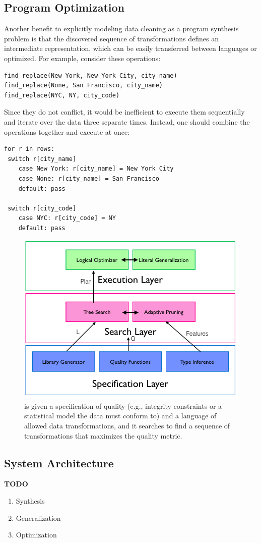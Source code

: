 \subsection{Program Optimization}
Another benefit to explicitly modeling data cleaning as a program synthesis problem is that the discovered sequence of transformations defines an intermediate
representation, which can be easily transferred between languages or optimized.
For example, consider these operations:
\begin{lstlisting}
find_replace(New York, New York City, city_name)
find_replace(None, San Francisco, city_name)
find_replace(NYC, NY, city_code)
\end{lstlisting}
Since they do not conflict, it would be inefficient to execute them sequentially and iterate over the data three separate times.
Instead, one should combine the operations together and execute at once:
\begin{lstlisting}
for r in rows:
 switch r[city_name]
    case New York: r[city_name] = New York City
    case None: r[city_name] = San Francisco
    default: pass
    
 switch r[city_code]
    case NYC: r[city_code] = NY
    default: pass
\end{lstlisting}


\begin{figure}[t]
\centering
 \includegraphics[width=\columnwidth]{figures/alphacleanarch.png}
 \caption{ \sys is given a specification of quality (e.g., integrity constraints or a statistical model the data must conform to) and a language  of  allowed  data  transformations,  and  it  searches  to find a sequence of transformations that maximizes the quality metric. }
\end{figure}


\subsection{System Architecture}

\textbf{TODO}

\begin{enumerate}
    \item Synthesis
    \item Generalization
    \item Optimization
\end{enumerate}





